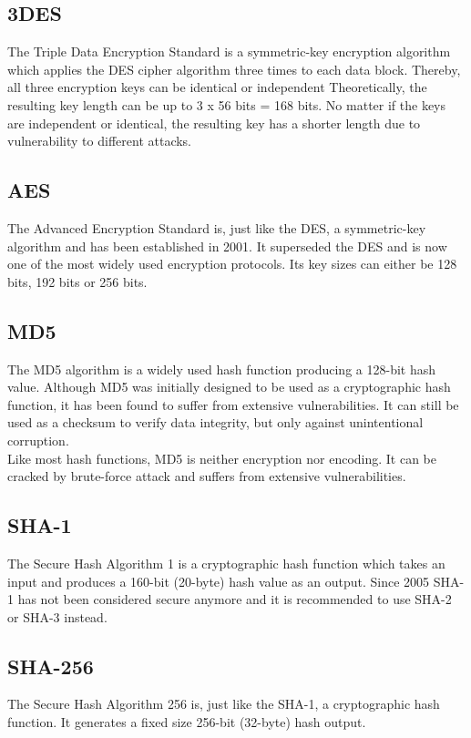 \subsection{3DES}
The Triple Data Encryption Standard is a symmetric-key encryption algorithm which applies the DES cipher algorithm three times to each data block. Thereby, all three encryption keys can be identical or independent Theoretically, the resulting key length can be up to 3 x 56 bits = 168 bits. No matter if the keys are independent or identical, the resulting key has a shorter length due to vulnerability to different attacks. \cite{3DES_Wikipedia}
%
%
\subsection{AES}
The Advanced Encryption Standard is, just like the DES, a symmetric-key algorithm and has been established in 2001. It superseded the DES and is now one of the most widely used encryption protocols. Its key sizes can either be 128 bits, 192 bits or 256 bits. \cite{AES_Wikipedia}
%
%
\subsection{MD5}
The MD5 algorithm is a widely used hash function producing a 128-bit hash value. Although MD5 was initially designed to be used as a cryptographic hash function, it has been found to suffer from extensive vulnerabilities. It can still be used as a checksum to verify data integrity, but only against unintentional corruption.\\
Like most hash functions, MD5 is neither encryption nor encoding. It can be cracked by brute-force attack and suffers from extensive vulnerabilities. \cite{MD5_Wikipedia}
%
%
\subsection{SHA-1}
The Secure Hash Algorithm 1 is a cryptographic hash function which takes an input and produces a 160-bit (20-byte) hash value as an output. Since 2005 SHA-1 has not been considered secure anymore and it is recommended to use SHA-2 or SHA-3 instead. \cite{SHA1_Wikipedia}
%
%
\subsection{SHA-256}
The Secure Hash Algorithm 256 is, just like the SHA-1, a cryptographic hash function. It generates a fixed size 256-bit (32-byte) hash output.
